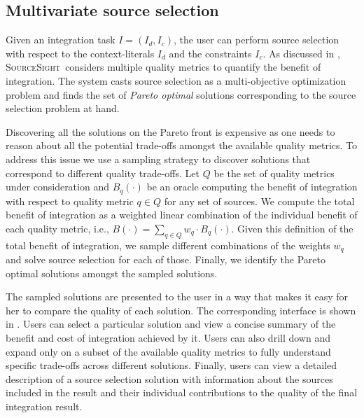 \documentclass{sig-alternate-05-2015}
\newcommand\system{\textsc{SourceSight}}
\begin{document}
\subsection{Multivariate source selection}
\label{sec:sourcesel}
Given an integration task $I = (I_d,I_c)$, the user can perform source selection with respect to the context-literals $I_d$ and the constraints $I_c$. As discussed in , \system~considers multiple quality metrics to quantify the benefit of integration. The system casts source selection as a multi-objective optimization problem and finds the set of {\em Pareto optimal} solutions corresponding to the source selection problem at hand. 

Discovering all the solutions on the Pareto front is expensive as one needs to reason about all the potential trade-offs amongst the available quality metrics. To address this issue we use a sampling strategy to discover solutions that correspond to different quality trade-offs. Let $Q$ be the set of quality metrics under consideration and $B_q(\cdot)$ be an oracle computing the benefit of integration with respect to quality metric $q \in Q$ for any set of sources. We compute the total benefit of integration as a weighted linear combination of the individual benefit of each quality metric, i.e., $B(\cdot) = \sum_{q \in Q} w_q \cdot B_q(\cdot)$. Given this definition of the total benefit of integration, we sample different combinations of the weights $w_q$ and solve source selection for each of those. Finally, we identify the Pareto optimal solutions amongst the sampled solutions. 

The sampled solutions are presented to the user in a way that makes it easy for her to compare the quality of each solution. The corresponding interface is shown in . Users can select a particular solution and view a concise summary of the benefit and cost of integration achieved by it. Users can also drill down and expand only on a subset of the available quality metrics to fully understand specific trade-offs across different solutions. Finally, users can view a detailed description of a source selection solution with information about the sources included in the result and their individual contributions to the quality of the final integration result. 
\end{document}

